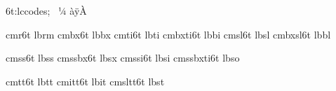 
\modifydef 6t:lccodes; {%
   \skipfirststep
   \lccodesloop ^^a0^^bc^^80%
   \lccodesloop ^^e0^^ff^^c0%
   \def\lccodesback {\zerolccodes ^^80^^ff}%
}



\registerECfont    cmr6t       lbrm %
\registerECfont    cmbx6t      lbbx %
\registerECfont    cmti6t      lbti %
\registerECfont    cmbxti6t    lbbi %
\registerECfont    cmsl6t      lbsl %
\registerECfont    cmbxsl6t    lbbl %

\registerECfont    cmss6t      lbss %
\registerECfont    cmssbx6t    lbsx %
\registerECfont    cmssi6t     lbsi %
\registerECfont    cmssbxti6t  lbso %

\registerECTTfont  cmtt6t      lbtt %
\registerECTTfont  cmitt6t     lbit %
\registerECTTfont  cmsltt6t    lbst %

